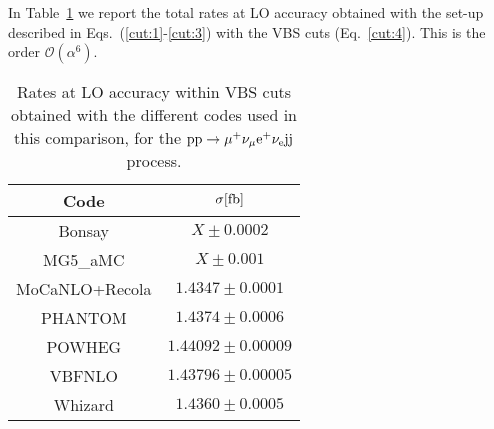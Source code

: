 In Table~\ref{tab:wg1_LOrates} we report the total rates at LO accuracy obtained with the set-up described in Eqs.~(\ref{cut:1}-\ref{cut:3}) with the VBS cuts (Eq.~\ref{cut:4}).
This is the order $\mathcal{O}(\alpha^6)$.

\begin{table}[h!]
    \centering
    \begin{tabular}{c|c}
        Code  &  $\sigma[\rm{fb}]$  \\
        \hline
        \hline
        {\sc Bonsay}  &  $X \pm 0.0002$ \\
        {\sc MG5\_aMC}&  $X \pm 0.001$  \\ 
        {\sc MoCaNLO+Recola}  &  $1.4347 \pm 0.0001$ \\
        {\sc PHANTOM}&  $1.4374 \pm 0.0006 $  \\
        {\sc POWHEG}  &  $1.44092 \pm 0.00009$ \\
        {\sc VBFNLO}  &  $1.43796 \pm 0.00005$ \\
        {\sc Whizard}&  $1.4360 \pm 0.0005 $
    \end{tabular}
    \caption{\label{tab:wg1_LOrates} Rates at LO accuracy within VBS cuts obtained with the different codes used in this comparison, 
    for the ${\rm p}{\rm p}\to\mu^+\nu_\mu{\rm e}^+\nu_{\rm e}{\rm j}{\rm j}$ process.}
\end{table}

